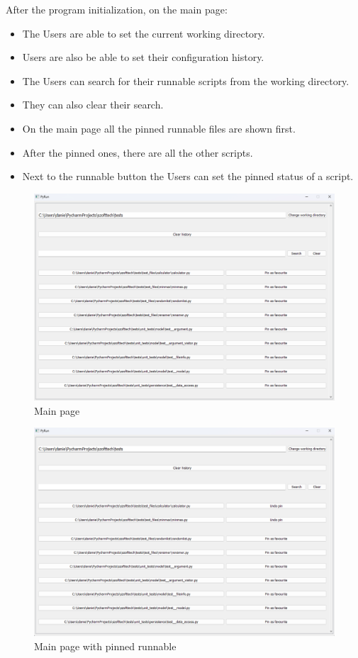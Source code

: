 \documentclass{article}
\begin{document}
After the program initialization, on the main page:
\begin{itemize}
    \item The Users are able to set the current working directory.
    \item Users are also be able to set their configuration history.
    \item The Users can search for their runnable scripts from the working directory.
    \item They can also clear their search.
    \item On the main page all the pinned runnable files are shown first.
    \item After the pinned ones, there are all the other scripts.
    \item Next to the runnable button the Users can set the pinned status of a script.
\end{itemize}

\begin{figure}[h]
    \centering
    \includegraphics[width=1\linewidth]{img/main_page.png}
    \caption{Main page}
    \label{fig:enter-label}
\end{figure}

\begin{figure}[h]
    \centering
    \includegraphics[width=1\linewidth]{img/pinned.png}
    \caption{Main page with pinned runnable}
    \label{fig:enter-label}
\end{figure}
\end{document}
